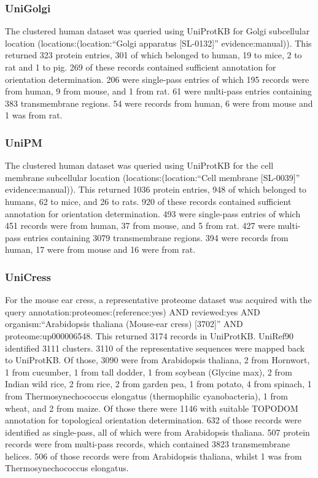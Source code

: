 \subsubsection{UniGolgi}
The clustered human dataset was queried using UniProtKB for Golgi subcellular location (locations:(location:``Golgi apparatus [SL-0132]'' evidence:manual)).
This returned 323 protein entries, 301 of which belonged to human, 19 to mice, 2 to rat and 1 to pig.
269 of these records contained sufficient annotation for orientation determination.
206 were single\--pass entries of which 195 records were from human, 9 from mouse, and 1 from rat.
61 were multi\--pass entries containing 383 transmembrane regions.
54 were records from human, 6 were from mouse and 1 was from rat.

\subsubsection{UniPM}
The clustered human dataset was queried using UniProtKB for the cell membrane subcellular location (locations:(location:``Cell membrane [SL-0039]'' evidence:manual)).
This returned 1036 protein entries, 948 of which belonged to humans, 62 to mice, and 26 to rats.
920 of these records contained sufficient annotation for orientation determination.
493 were single\--pass entries of which 451 records were from human, 37 from mouse, and 5 from rat.
427 were multi\--pass entries containing 3079 transmembrane regions.
394 were records from human, 17 were from mouse and 16 were from rat.

\subsubsection{UniCress}
For the mouse ear cress, a representative proteome dataset was acquired with the query annotation:proteomes:(reference:yes) AND reviewed:yes AND organism:``Arabidopsis thaliana (Mouse-ear cress) [3702]'' AND proteome:up000006548.
This returned 3174 records in UniProtKB.
UniRef90 identified 3111 clusters.
3110 of the representative sequences were mapped back to UniProtKB.
Of those, 3090 were from Arabidopsis thaliana, 2 from Hornwort, 1 from cucumber, 1 from tall dodder, 1 from soybean (Glycine max), 2 from Indian wild rice, 2 from rice, 2 from garden pea, 1 from potato, 4 from spinach, 1 from Thermosynechococcus elongatus (thermophilic cyanobacteria), 1 from wheat, and 2 from maize.
Of those there were 1146 with suitable TOPO\textunderscore DOM annotation for topological orientation determination.
632 of those records were identified as single\--pass, all of which were from Arabidopsis thaliana.
507 protein records were from multi\--pass records, which contained 3823 transmembrane helices.
506 of those records were from Arabidopsis thaliana, whilst 1 was from Thermosynechococcus elongatus.


